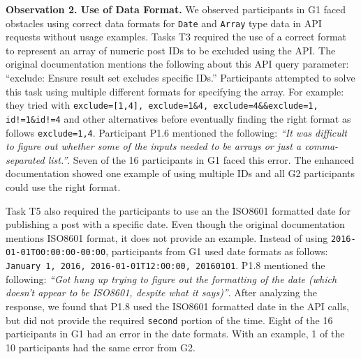 \hspace{-5mm}
\vspace{0.5mm}


\textbf{Observation 2. Use of Data Format.} We observed participants in G1 faced obstacles using correct data formats for \lstinline{Date} and \lstinline{Array} type data in API requests without usage examples. Tasks T3 required the use of a correct format to represent an array of numeric post IDs to be excluded using the API. The original documentation mentions the following about this API query parameter: ``exclude: Ensure result set excludes specific IDs.'' Participants attempted to solve this task using multiple different formats for specifying the array. For example: they tried with \lstinline{exclude=[1,4], exclude=1&4, exclude=4&&exclude=1, id!=1&id!=4} and other alternatives before eventually finding the right format as follows \lstinline{exclude=1,4}. Participant P1.6 mentioned the following: \textit{``It was difficult to figure out whether some of the inputs needed to be arrays or just a comma-separated list.''}. Seven of the 16 participants in G1 faced this error. The enhanced documentation showed one example of using multiple IDs and all G2 participants could use the right format.

Task T5 also required the participants to use an the ISO8601 formatted date for publishing a post with a specific date. Even though the original documentation mentions ISO8601 format, it does not provide an example. Instead of using \lstinline{2016-01-01T00:00:00-00:00}, participants from G1 used date formats as follows: \lstinline{January 1, 2016, 2016-01-01T12:00:00, 20160101}. P1.8 mentioned the following: \textit{``Got hung up trying to figure out the formatting of the date (which doesn't appear to be ISO8601, despite what it says)''}. After analyzing the response, we found that P1.8 used the ISO8601 formatted date in the API calls, but did not provide the required \lstinline{second} portion of the time. Eight of the 16 participants in G1 had an error in the date formats. With an example, 1 of the 10 participants had the same error from G2.

